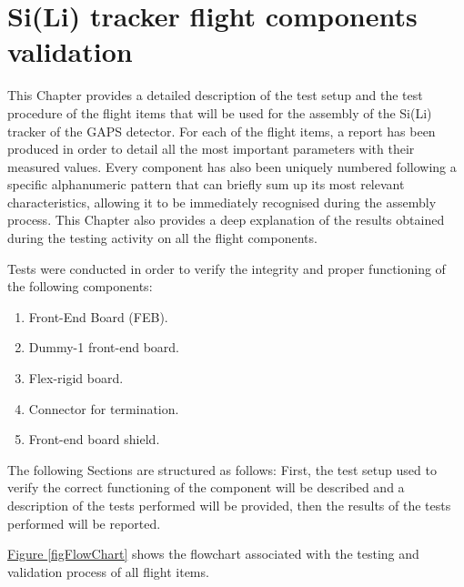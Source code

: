 \chapter[Si(Li) tracker flight components validation]{Si(Li) tracker flight components \\validation} \label{ch2}

This Chapter provides a detailed description of the test setup and the test procedure of the flight items that will be used for the assembly of the Si(Li) tracker of the GAPS detector. For each of the flight items, a report has been produced in order to detail all the most important parameters with their measured values. Every component has also been uniquely numbered following a specific alphanumeric pattern that can briefly sum up its most relevant characteristics, allowing it to be immediately recognised during the assembly process. This Chapter also provides a deep explanation of the results obtained during the testing activity on all the flight components.

\par
Tests were conducted in order to verify the integrity and proper functioning of the following components:

\begin{enumerate}
    \bfseries
    \itemsep0em 
    \item Front-End Board (FEB).
    \item Dummy-1 front-end board.
    \item Flex-rigid board.
    \item Connector for termination.
    \item Front-end board shield.
\end{enumerate}

\par
The following Sections are structured as follows: First, the test setup used to verify the correct functioning of the component will be described and a description of the tests performed will be provided, then the results of the tests performed will be reported. 


\hyperref[figFlowChart]{Figure \ref{figFlowChart}} shows the flowchart associated with the testing and validation process of all flight items.

